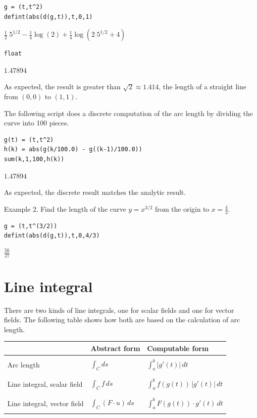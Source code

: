 \documentclass[12pt]{article}
\begin{document}
{\color{blue}
\begin{verbatim}
g = (t,t^2)
defint(abs(d(g,t)),t,0,1)
\end{verbatim}}

$
\tfrac{1}{2}\;5^{1/2}
-\tfrac{1}{4}\log(2)
+\tfrac{1}{4}\log(2\;5^{1/2}+4)
$

{\color{blue}
\begin{verbatim}
float
\end{verbatim}}

$1.47894$

\bigskip
As expected, the result is greater than $\sqrt2\approx1.414$,
the length of a straight line from $(0,0)$ to $(1,1)$.

\bigskip
The following script does a discrete computation of the arc length
by dividing the curve into 100 pieces.

{\color{blue}
\begin{verbatim}
g(t) = (t,t^2)
h(k) = abs(g(k/100.0) - g((k-1)/100.0))
sum(k,1,100,h(k))
\end{verbatim}}

$1.47894$

\bigskip
As expected, the discrete result matches the analytic result.

\bigskip
Example 2.
Find the length of the curve $y=x^{3/2}$ from the origin to
$x=\tfrac{4}{3}$.

{\color{blue}
\begin{verbatim}
g = (t,t^(3/2))
defint(abs(d(g,t)),t,0,4/3)
\end{verbatim}}

$\displaystyle \tfrac{56}{27}$

\newpage

\section{Line integral}

There are two kinds of line integrals,
one for scalar fields and one for vector fields.
The following table shows how both are based on the calculation of
arc length.

\begin{center}
\begin{tabular}{|l|l|l|}
\hline
& Abstract form
& Computable form
\\
\hline
& &\\
Arc length
& $\displaystyle{\int_C ds}$
& $\displaystyle{\int_a^b |g'(t)|\,dt}$\\
& &\\
\hline
 & & \\
Line integral, scalar field
& $\displaystyle{\int_C f\,ds}$
& $\displaystyle{\int_a^b f(g(t))\,|g'(t)|\,dt}$\\
& &\\
\hline
 & & \\
Line integral, vector field
& $\displaystyle{\int_C(F\cdot u)\,ds}$
& $\displaystyle{\int_a^b F(g(t))\cdot g'(t)\,dt}$\\
 & & \\
\hline
\end{tabular}
\end{center}
\end{document}
